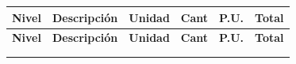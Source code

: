 \documentclass[11pt,a4paper]{article}
\begin{document}
\renewcommand{\arraystretch}{1.2}
\begin{longtable}{@{} >{\centering\arraybackslash}p{1.46cm} p{7.69cm} >{\centering\arraybackslash}p{1.31cm} >{\raggedleft\arraybackslash}p{1.15cm} >{\raggedleft\arraybackslash}p{1.40cm} >{\raggedleft\arraybackslash}p{1.88cm} @{}}
  \toprule
  \rowcolor{Gris2}
  \textbf{Nivel} & \textbf{Descripción} & \textbf{Unidad} & \textbf{Cant} & \textbf{P.U.} & \textbf{Total}\\
  \midrule
  \endfirsthead

  \toprule
  \rowcolor{Gris2}
  \textbf{Nivel} & \textbf{Descripción} & \textbf{Unidad} & \textbf{Cant} & \textbf{P.U.} & \textbf{Total}\\
  \midrule
  \endhead

  \midrule
  \multicolumn{6}{r}{\textit{Contin\'ua...}}\\
  \endfoot

  \bottomrule
  \endlastfoot


\end{longtable}
\end{document}

